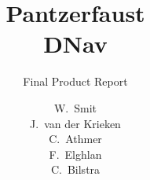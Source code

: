 \documentclass[oneside, whitelogo]{tudelft-report}
\begin{document}
	
	\frontmatter
	
	\title{Pantzerfaust\\DNav}
	\subtitle[tudelft-white]{Final Product Report}
	\author[tudelft-white]{
		W.\ Smit\\
		J.\ van der Krieken\\
		C.\ Athmer\\
		F.\ Elghlan\\
		C.\ Bilstra\\
	}
	\titleoffsetx{1cm}
	\titleoffsety{6.5cm}
	\afiloffsetx{1cm} 
	\afiloffsety{18cm} 
	
	\makecover
	
	
	
	\tableofcontents
	
	
	\mainmatter
	
	
	
	
	
	
	
	
	
	
	
%	
	
	
	
	
	\appendix
	
	
	
	
	
	\nocite{*}
	
\end{document}

